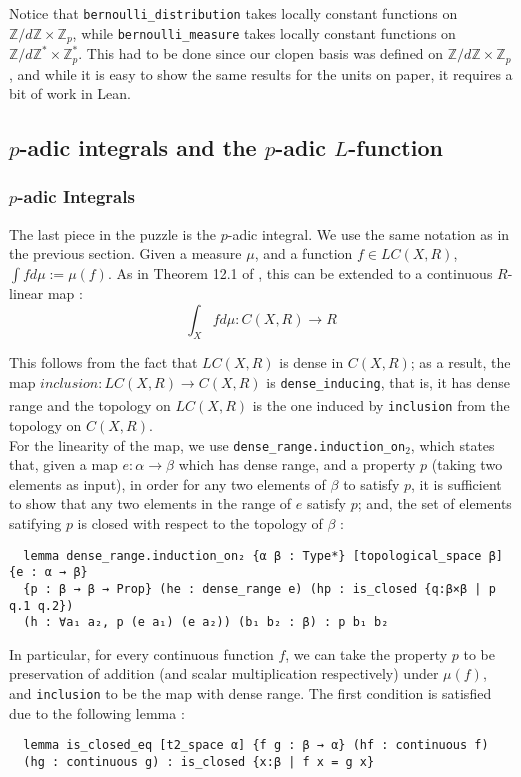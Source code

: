 \documentclass[a4paper,UKenglish,cleveref, autoref, thm-restate]{lipics-v2021}
\newcommand{\lean}[1]{\texttt{#1}\xspace} %
\begin{document}
Notice that \lean{bernoulli\_distribution} takes locally constant functions on $\mathbb{Z}/d \mathbb{Z} \times \mathbb{Z}_p$, 
while \newline \lean{bernoulli\_measure} takes locally constant functions on $\mathbb{Z}/d \mathbb{Z}^* \times \mathbb{Z}_p^*$. This had to be done since our clopen basis was defined on 
$\mathbb{Z}/d \mathbb{Z} \times \mathbb{Z}_p$, and while it is easy to show the same results for the units on paper, it requires a bit of work in Lean.

\subsection{$p$-adic integrals and the $p$-adic $L$-function}
\subsubsection{$p$-adic Integrals}
The last piece in the puzzle is the $p$-adic integral. We use the same notation as in the previous
section. Given a measure $\mu$, and a function $f \in LC(X, R)$,
$\int f d\mu := \mu(f)$. As in Theorem 12.1 of \cite{cyc}, this can be extended to a
continuous $R$-linear map :
$$ \int_X f d\mu : C(X, R) \xrightarrow[]{} R $$

This follows from the fact that $LC(X, R)$ is dense in $C(X, R)$; as a result, the map 
\newline $inclusion : LC(X, R) \xrightarrow[]{} C(X, R)$
is \lean{dense\_inducing}, that is, it has dense range and the topology on $LC(X, R)$ is the one
induced by \lean{inclusion} from the topology on $C(X,R)$. \\

For the linearity of the map, we use \lean{dense\_range.induction\_on$_2$}, which states that, given a map $e : \alpha \to \beta$ which has dense range, 
and a property $p$ (taking two elements as input), in order for any two elements of $\beta$ to satisfy $p$, it is sufficient to show that any two elements 
in the range of $e$ satisfy $p$; and, the set of elements satifying $p$ is closed with respect to the topology of $\beta$ :
\begin{lstlisting}
  lemma dense_range.induction_on₂ {α β : Type*} [topological_space β] {e : α → β} 
  {p : β → β → Prop} (he : dense_range e) (hp : is_closed {q:β×β | p q.1 q.2}) 
  (h : ∀a₁ a₂, p (e a₁) (e a₂)) (b₁ b₂ : β) : p b₁ b₂
\end{lstlisting}

In particular, for every continuous function $f$, we can take the property $p$ to be preservation of addition (and scalar multiplication respectively) under 
$\mu (f)$, and \lean{inclusion} to be the map with dense range. The first condition is satisfied due to the following lemma :
\begin{lstlisting}
  lemma is_closed_eq [t2_space α] {f g : β → α} (hf : continuous f) 
  (hg : continuous g) : is_closed {x:β | f x = g x}
\end{lstlisting}
\end{document}
